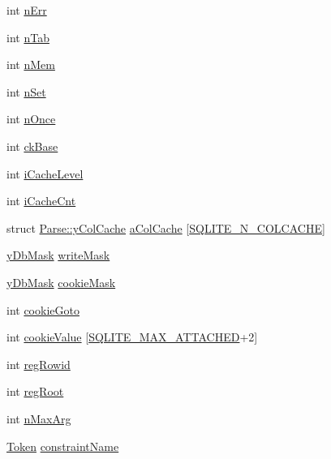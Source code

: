 \begin{DoxyCompactItemize}
\item 
int \hyperlink{struct_parse_ac7206f0c7e580ab32b7dfb20950bb1c9}{n\-Err}
\item 
int \hyperlink{struct_parse_a6b3a46e1f275962fa8808dddba20ba23}{n\-Tab}
\item 
int \hyperlink{struct_parse_aa66b48b0ababc17403615c899cddec9c}{n\-Mem}
\item 
int \hyperlink{struct_parse_ac84102ff47885dfa854de5af1d15605b}{n\-Set}
\item 
int \hyperlink{struct_parse_a86d32dcaec08841210090c261c69a8b1}{n\-Once}
\item 
int \hyperlink{struct_parse_a07e8e916fb569a86acfa5f380afaaf77}{ck\-Base}
\item 
int \hyperlink{struct_parse_a5b06d03e7605a6f55369481c050ac0a8}{i\-Cache\-Level}
\item 
int \hyperlink{struct_parse_ac4633493fd5f100fa823344be1c19d1e}{i\-Cache\-Cnt}
\item 
struct \hyperlink{struct_parse_1_1y_col_cache}{Parse\-::y\-Col\-Cache} \hyperlink{struct_parse_a788b85979d58b84e06bc367bac5b3f3f}{a\-Col\-Cache} \mbox{[}\hyperlink{sqlite3_8c_a93bdf7a445214ebff384cce4c990a078}{S\-Q\-L\-I\-T\-E\-\_\-\-N\-\_\-\-C\-O\-L\-C\-A\-C\-H\-E}\mbox{]}
\item 
\hyperlink{sqlite3_8c_aa9f65e0e36379aa834aac7932ba91bc3}{y\-Db\-Mask} \hyperlink{struct_parse_a4939b6d4fd3f48731b58b8a6f51417cd}{write\-Mask}
\item 
\hyperlink{sqlite3_8c_aa9f65e0e36379aa834aac7932ba91bc3}{y\-Db\-Mask} \hyperlink{struct_parse_a7c0b37cf797fd157234cb2e306cba2e4}{cookie\-Mask}
\item 
int \hyperlink{struct_parse_a38a03495b8b18e86c2855c70b717d921}{cookie\-Goto}
\item 
int \hyperlink{struct_parse_a6023169734f87ce27a760e0f9026c381}{cookie\-Value} \mbox{[}\hyperlink{sqlite3_8c_ac6ac68ce9bff1bc9d8018890df9f45c4}{S\-Q\-L\-I\-T\-E\-\_\-\-M\-A\-X\-\_\-\-A\-T\-T\-A\-C\-H\-E\-D}+2\mbox{]}
\item 
int \hyperlink{struct_parse_a63f71c268a7a77cb0df5619dd8ebbacd}{reg\-Rowid}
\item 
int \hyperlink{struct_parse_afcf3d47e9424b79e6911cf366cb73bd4}{reg\-Root}
\item 
int \hyperlink{struct_parse_aab781bff62f93c0f9a7ca979a3b3a820}{n\-Max\-Arg}
\item 
\hyperlink{struct_token}{Token} \hyperlink{struct_parse_a40cbce90eedbd57143416c8bc28fec46}{constraint\-Name}
\item 

\end{DoxyCompactItemize}
